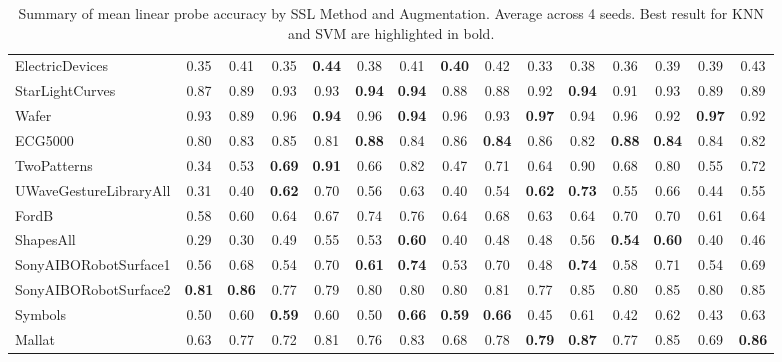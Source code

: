 \documentclass[../../thesis.tex]{subfiles}
\begin{document}
\begin{table}[h!]
\begin{adjustbox}{width=\textwidth}
\begin{tabular}{lcc|cc|cc|cc|cc|cc|cc}
        ElectricDevices         & 0.35 & 0.41 & 0.35 & \textbf{0.44} & 0.38 & 0.41 & \textbf{0.40} & 0.42 & 0.33 & 0.38 & 0.36 & 0.39 & 0.39 & 0.43 \\
        StarLightCurves         & 0.87 & 0.89 & 0.93 & 0.93 & \textbf{0.94} & \textbf{0.94} & 0.88 & 0.88 & 0.92 & \textbf{0.94} & 0.91 & 0.93 & 0.89 & 0.89 \\
        Wafer                   & 0.93 & 0.89 & 0.96 & \textbf{0.94} & 0.96 & \textbf{0.94} & 0.96 & 0.93 & \textbf{0.97} & 0.94 & 0.96 & 0.92 & \textbf{0.97} & 0.92 \\
        ECG5000                 & 0.80 & 0.83 & 0.85 & 0.81 & \textbf{0.88} & 0.84 & 0.86 & \textbf{0.84} & 0.86 & 0.82 & \textbf{0.88} & \textbf{0.84} & 0.84 & 0.82 \\
        TwoPatterns             & 0.34 & 0.53 & \textbf{0.69} &\textbf{ 0.91} & 0.66 & 0.82 & 0.47 & 0.71 & 0.64 & 0.90 & 0.68 & 0.80 & 0.55 & 0.72 \\
        UWaveGestureLibraryAll  & 0.31 & 0.40 & \textbf{0.62} & 0.70 & 0.56 & 0.63 & 0.40 & 0.54 & \textbf{0.62} & \textbf{0.73} & 0.55 & 0.66 & 0.44 & 0.55 \\
        FordB                   & 0.58 & 0.60 & 0.64 & 0.67 & 0.74 & 0.76 & 0.64 & 0.68 & 0.63 & 0.64 & 0.70 & 0.70 & 0.61 & 0.64\\
        ShapesAll               & 0.29 & 0.30 & 0.49 & 0.55 & 0.53 & \textbf{0.60} & 0.40 & 0.48 & 0.48 & 0.56 &\textbf{ 0.54} & \textbf{0.60} & 0.40 & 0.46 \\
        SonyAIBORobotSurface1   & 0.56 & 0.68 & 0.54 & 0.70 & \textbf{0.61} & \textbf{0.74} & 0.53 & 0.70 & 0.48 & \textbf{0.74} & 0.58 & 0.71 & 0.54 & 0.69 \\
        SonyAIBORobotSurface2   & \textbf{0.81} & \textbf{0.86} & 0.77 & 0.79 & 0.80 & 0.80 & 0.80 & 0.81 & 0.77 & 0.85 & 0.80 & 0.85 & 0.80 & 0.85  \\
        Symbols                 & 0.50 & 0.60 & \textbf{0.59} & 0.60 & 0.50 & \textbf{0.66} & \textbf{0.59} & \textbf{0.66} & 0.45 & 0.61 & 0.42 & 0.62 & 0.43 & 0.63 \\
        Mallat                  & 0.63 & 0.77 & 0.72 & 0.81 & 0.76 & 0.83 & 0.68 & 0.78 & \textbf{0.79} & \textbf{0.87} & 0.77 & 0.85 & 0.69 & \textbf{0.86} \\
        \bottomrule
    \end{tabular}
    \end{adjustbox}
    
    \caption{Summary of mean linear probe accuracy by SSL Method and Augmentation. Average across 4 seeds. Best result for KNN and SVM are highlighted in bold.}
\end{table}
\end{document}
